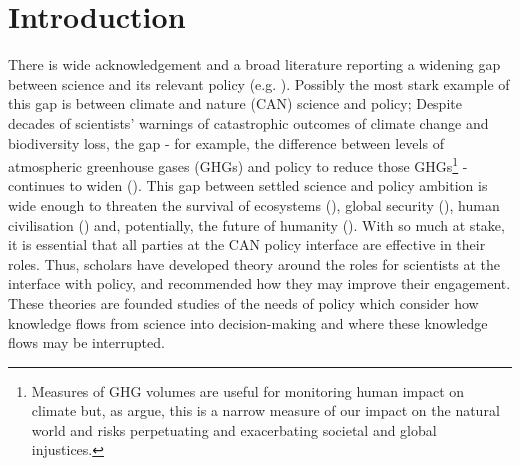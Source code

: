 \chapter{Introduction}\label{ch:intro}

There is wide acknowledgement and a broad literature reporting a widening gap between science and its relevant policy (e.g. \cite{Nau2009,EdlerKB2022}). Possibly the most stark example of this gap is between climate and nature (CAN) science and policy; Despite decades of scientists' warnings of catastrophic outcomes of climate change and biodiversity loss, the gap - for example, the difference between levels of atmospheric greenhouse gases (GHGs) and policy to reduce those GHGs\footnote{Measures of GHG volumes are useful for monitoring human impact on climate but, as \textcite{MorenoSF2016} argue, this is a narrow measure of our impact on the natural world and risks perpetuating and exacerbating societal and global injustices.} - continues to widen (\cite{StoddardEtAl2021,IPBES2022,IPCC2023}). This gap between settled science and policy ambition is wide enough to threaten the survival of ecosystems (\cite{DiazEtAl2019,IPBES2022}), global security (\cite{WEF2024}), human civilisation (\cite{TschakertEAKO2019}) and, potentially, the future of humanity (\cite{McKayEtAl2022}). With so much at stake, it is essential that all parties at the CAN policy interface are effective in their roles. Thus, scholars have developed theory around the roles for scientists at the interface with policy, and recommended how they may improve their engagement. These theories are founded studies of the needs of policy which consider how knowledge flows from science into decision-making and where these knowledge flows may be interrupted. 

